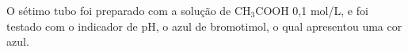         \indent O sétimo tubo foi preparado com a solução de CH$_3$COOH 0,1 mol/L, e foi testado com o indicador de pH, o azul de bromotimol, o qual apresentou uma cor azul.

        \begin{figure}
            \centering
            \qquad

\end{figure}
